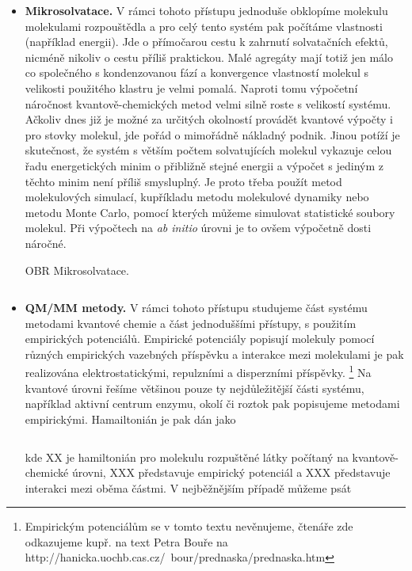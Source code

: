 \begin{itemize}

\item \textbf{Mikrosolvatace.} V rámci tohoto přístupu jednoduše obklopíme molekulu molekulami rozpouštědla a pro celý tento systém pak počítáme vlastnosti (například energii). Jde o přímočarou cestu k zahrnutí solvatačních efektů, nicméně nikoliv o cestu příliš praktickou. Malé agregáty mají totiž jen málo co společného s kondenzovanou fází a konvergence vlastností molekul s velikosti použitého klastru je velmi pomalá. Naproti tomu výpočetní náročnost kvantově-chemických metod velmi silně roste s velikostí systému. Ačkoliv dnes již je možné za určitých okolností provádět kvantové výpočty i pro stovky molekul, jde pořád o mimořádně nákladný podnik. Jinou potíží je skutečnost, že systém s větším počtem solvatujících molekul vykazuje celou řadu energetických minim o přibližně stejné energii a výpočet s jediným z těchto minim není příliš smysluplný. Je proto třeba použít metod molekulových simulací, kupříkladu metodu molekulové dynamiky nebo metodu Monte Carlo, pomocí kterých můžeme simulovat statistické soubory molekul. Při výpočtech na \textit{ab initio} úrovni je to ovšem výpočetně dosti náročné.

\bigskip
OBR Mikrosolvatace.
\bigskip

\begin{equation}
\label{rov:XXX}
\end{equation}



\item \textbf{QM/MM metody.} V rámci tohoto přístupu studujeme část systému metodami kvantové chemie a část jednoduššími přístupy, s použitím empirických potenciálů. Empirické potenciály popisují molekuly pomocí různých empirických vazebných příspěvku a interakce mezi molekulami je pak realizována elektrostatickými, repulzními a disperzními příspěvky. \footnote{Empirickým potenciálům se v tomto textu nevěnujeme, čtenáře zde odkazujeme kupř. na text Petra Bouře na http://hanicka.uochb.cas.cz/~bour/prednaska/prednaska.htm}  Na kvantové úrovni řešíme většinou pouze ty nejdůležitější části systému, například aktivní centrum enzymu, okolí či roztok pak popisujeme metodami empirickými. Hamailtonián je pak dán jako


\begin{equation}
\label{rov:XXX}
\end{equation}

\noindent kde XX je hamiltonián pro molekulu rozpuštěné látky počítaný na kvantově-chemické úrovni, XXX představuje empirický potenciál a XXX představuje interakci mezi oběma částmi. V nejběžnějším případě můžeme psát


\end{itemize}
